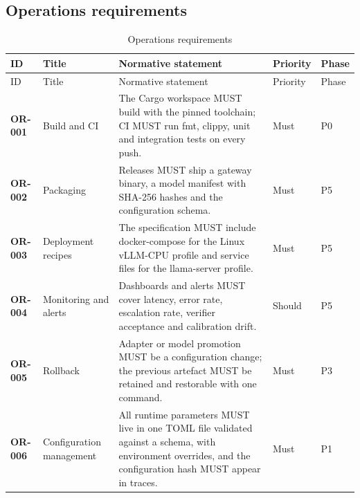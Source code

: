 \subsection{Operations requirements}
\begin{longtable}{@{}p{1.45cm}p{2.5cm}p{8.1cm}p{1.6cm}p{1.1cm}@{}}
\caption{Operations requirements}\\
\toprule ID & Title & Normative statement & Priority & Phase\\\midrule\endfirsthead
\toprule ID & Title & Normative statement & Priority & Phase\\\midrule\endhead
\bottomrule\endfoot
\textbf{OR-001} & Build and CI & The Cargo workspace MUST build with the pinned toolchain; CI MUST run fmt, clippy, unit and integration tests on every push. & Must & P0\\
\textbf{OR-002} & Packaging & Releases MUST ship a gateway binary, a model manifest with SHA-256 hashes and the configuration schema. & Must & P5\\
\textbf{OR-003} & Deployment recipes & The specification MUST include docker-compose for the Linux vLLM-CPU profile and service files for the llama-server profile. & Must & P5\\
\textbf{OR-004} & Monitoring and alerts & Dashboards and alerts MUST cover latency, error rate, escalation rate, verifier acceptance and calibration drift. & Should & P5\\
\textbf{OR-005} & Rollback & Adapter or model promotion MUST be a configuration change; the previous artefact MUST be retained and restorable with one command. & Must & P3\\
\textbf{OR-006} & Configuration management & All runtime parameters MUST live in one TOML file validated against a schema, with environment overrides, and the configuration hash MUST appear in traces. & Must & P1\\
\end{longtable}

